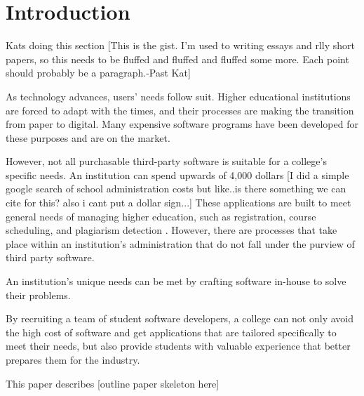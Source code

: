 \section{Introduction}
Kats doing this section
[This is the gist. I'm used to writing essays and rlly short papers, so this needs to be fluffed and fluffed and fluffed some more. Each point should probably be a paragraph.-Past Kat]

As technology advances, users' needs follow suit. Higher educational institutions are forced to adapt with the times, and their processes are making the transition from paper to digital. Many expensive software programs have been developed for these purposes and are on the market. 

However, not all purchasable third-party software is suitable for a college's specific needs. An institution can spend upwards of  4,000 dollars [I did a simple google search of school administration costs but like..is there something we can cite for this? also i cant put a dollar sign...] These applications are built to meet general needs of managing higher education, such as registration, course scheduling, and plagiarism detection \cite{plagarismsoftware}. However, there are processes that take place within an institution's administration that do not fall under the purview of third party software.

An institution's unique needs can be met by crafting software in-house to solve their problems. 

By recruiting a team of student software developers, a college can not only avoid the high cost of software and get applications that are tailored specifically to meet their needs, but also provide students with valuable experience that better prepares them for the industry. 

This paper describes [outline paper skeleton here]

